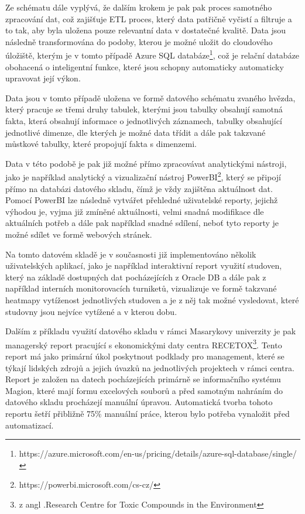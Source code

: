 \documentclass[
  digital,     %
  twoside,     %
  lof,         %
  lot,         %
]{fithesis4}
\begin{document}
Ze schématu dále vyplývá, že dalším krokem je pak pak proces samotného zpracování dat, což zajišťuje ETL proces, který data patřičně vyčistí a filtruje a to tak, aby byla uložena pouze relevantní data v dostatečné kvalitě. Data jsou následně transformována do podoby, kterou je možné uložit do cloudového úložiště, kterým je v tomto případě Azure SQL databáze\footnote{https://azure.microsoft.com/en-us/pricing/details/azure-sql-database/single/}, což je relační databáze obohacená o inteligentní funkce, které jsou schopny automaticky automaticky upravovat její výkon.

Data jsou v tomto případě uložena ve formě datového schématu zvaného hvězda, který pracuje se třemi druhy tabulek, kterými jsou tabulky obsahují samotná fakta, která obsahují informace o jednotlivých záznamech, tabulky obsahující jednotlivé dimenze, dle kterých je možné data třídit a dále pak takzvané můstkové tabulky, které propojují fakta s dimenzemi. 

Data v této podobě je pak již možné přímo zpracovávat analytickými nástroji, jako je například analytický a vizualizační nástroj PowerBI\footnote{https://powerbi.microsoft.com/cs-cz/}, který se připojí přímo na databázi datového skladu, čímž je vždy zajištěna aktuálnost dat. Pomocí PowerBI lze následně vytvářet přehledné uživatelské reporty, jejichž výhodou je, vyjma již zmíněné aktuálnosti,  velmi snadná modifikace dle aktuálních potřeb a dále pak například snadné sdílení, neboť tyto reporty je možné sdílet ve formě webových stránek. 

Na tomto datovém skladě je v současnosti již implementováno několik uživatelských aplikací, jako je například interaktivní report využití studoven, který na základě dostupných dat pocházejících z Oracle DB a dále pak z například interních monitorovacích turniketů, vizualizuje ve formě takzvané heatmapy vytíženost jednotlivých studoven  a je z něj tak možné vysledovat, které studovny jsou nejvíce vytížené a v kterou dobu. 

Dalším z příkladu využití datového skladu v rámci Masarykovy univerzity je pak managerský report pracující s ekonomickými daty centra RECETOX\footnote{z angl .Research Centre for Toxic Compounds in the Environment}. Tento report má jako primární úkol poskytnout podklady pro management, které se týkají lidských zdrojů a jejich úvazků na jednotlivých projektech v rámci centra. Report je  založen na datech pocházejících primárně se informačního systému Magion, které mají formu excelových souborů a před samotným nahráním do datového skladu procházejí manuální úpravou. Automatická tvorba tohoto reportu šetří přibližně 75\% manuální práce, kterou bylo potřeba vynaložit před automatizací.
\end{document}
